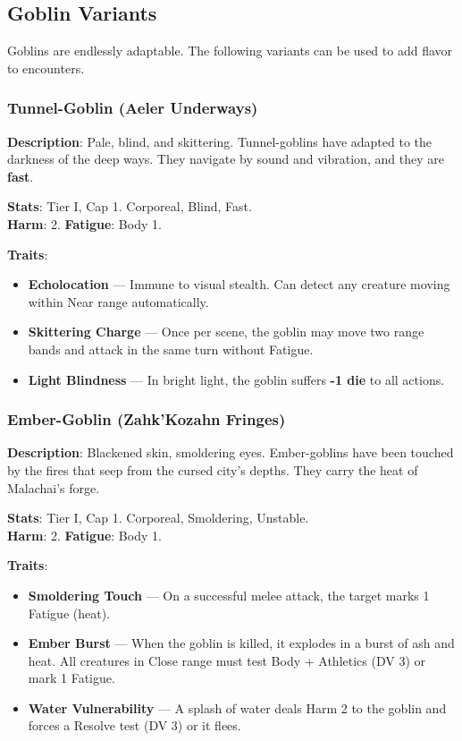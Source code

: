 \subsection{Goblin Variants}

Goblins are endlessly adaptable. The following variants can be used to add flavor to encounters.

\subsubsection{Tunnel-Goblin (Aeler Underways)}

\textbf{Description}: Pale, blind, and skittering. Tunnel-goblins have adapted to the darkness of the deep ways. They navigate by sound and vibration, and they are \textbf{fast}.

\textbf{Stats}: Tier I, Cap 1. Corporeal, Blind, Fast.\\
\textbf{Harm}: 2. \textbf{Fatigue}: Body 1.

\textbf{Traits}:
\begin{itemize}
    \item \textbf{Echolocation} --- Immune to visual stealth. Can detect any creature moving within Near range automatically.
    \item \textbf{Skittering Charge} --- Once per scene, the goblin may move two range bands and attack in the same turn without Fatigue.
    \item \textbf{Light Blindness} --- In bright light, the goblin suffers \textbf{-1 die} to all actions.
\end{itemize}

\subsubsection{Ember-Goblin (Zahk'Kozahn Fringes)}

\textbf{Description}: Blackened skin, smoldering eyes. Ember-goblins have been touched by the fires that seep from the cursed city's depths. They carry the heat of Malachai's forge.

\textbf{Stats}: Tier I, Cap 1. Corporeal, Smoldering, Unstable.\\
\textbf{Harm}: 2. \textbf{Fatigue}: Body 1.

\textbf{Traits}:
\begin{itemize}
    \item \textbf{Smoldering Touch} --- On a successful melee attack, the target marks 1 Fatigue (heat).
    \item \textbf{Ember Burst} --- When the goblin is killed, it explodes in a burst of ash and heat. All creatures in Close range must test Body + Athletics (DV 3) or mark 1 Fatigue.
    \item \textbf{Water Vulnerability} --- A splash of water deals Harm 2 to the goblin and forces a Resolve test (DV 3) or it flees.
\end{itemize}

